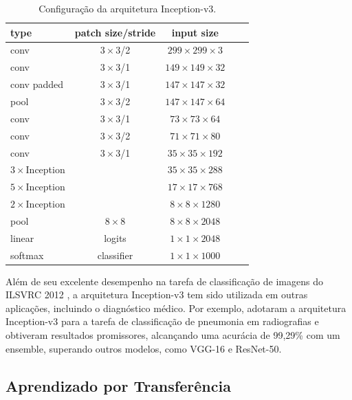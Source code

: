 \begin{table}[ht]
    \centering
    \footnotesize
    \begin{tabular}{|l|c|c|c|c|}
        \hline
        \textbf{type} & \textbf{patch size/stride} & \textbf{input size} \\
        \hline
        conv & $3\times3$/2 & $299\times299\times3$ \\
        \hline
        conv & $3\times3$/1 & $149\times149\times32$ \\
        \hline
        conv padded & $3\times3$/1 & $147\times147\times32$ \\
        \hline
        pool & $3\times3$/2 & $147\times147\times64$ \\
        \hline
        conv & $3\times3$/1 & $73\times73\times64$ \\
        \hline
        conv & $3\times3$/2 & $71\times71\times80$ \\
        \hline
        conv & $3\times3$/1 & $35\times35\times192$ \\
        \hline
        $3\times$Inception &  & $35\times35\times288$ \\
        \hline
        $5\times$Inception &  & $17\times17\times768$ \\
        \hline
        $2\times$Inception &  & $8\times8\times1280$ \\
        \hline
        pool & $8\times8$ & $8\times8\times2048$ \\
        \hline
        linear & logits & $1\times1\times2048$ \\
        \hline
        softmax & classifier & $1\times1\times1000$ \\
        \hline
    \end{tabular}
    \caption{Configuração da arquitetura Inception-v3.}
    \label{inception-v3-arch}
\end{table}

Além de seu excelente desempenho na tarefa de classificação de imagens do ILSVRC 2012 \citep{Russakovsky2015}, a arquitetura Inception-v3 tem sido utilizada em outras aplicações, incluindo o diagnóstico médico. Por exemplo, \cite{Mujahid2022} adotaram a arquitetura Inception-v3 para a tarefa de classificação de pneumonia em radiografias e obtiveram resultados promissores, alcançando uma acurácia de 99,29\% com um ensemble, superando outros modelos, como VGG-16 e ResNet-50.

\subsection{Aprendizado por Transferência}


